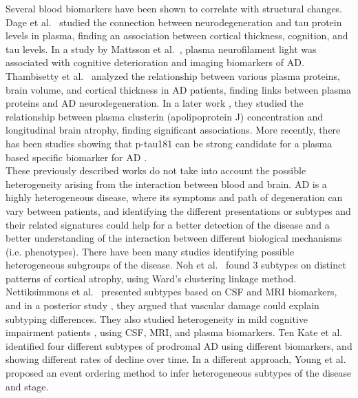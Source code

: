 Several blood biomarkers have been shown to correlate with structural changes. Dage et al.\ \cite{Dage2016} studied the connection between neurodegeneration and tau protein levels in plasma, finding an association between cortical thickness, cognition, and tau levels. In a study by Mattsson et al.\ \cite{Mattsson2017}, plasma neurofilament light was associated with cognitive deterioration and imaging biomarkers of AD. Thambisetty et al.\ \cite{Thambisetty2011} analyzed the relationship between various plasma proteins, brain volume, and cortical thickness in AD patients, finding links between plasma proteins and AD neurodegeneration. In a later work \cite{Thambisetty2012}, they studied the relationship between plasma clusterin (apolipoprotein J) concentration and longitudinal brain atrophy, finding significant associations.  More recently, there has been studies showing that p-tau181 can be strong candidate for a plasma based specific biomarker for AD \cite{Cullen2020,Moscoso2020,Karikari2020a}. \\

These previously described works do not take into account the possible heterogeneity arising from the interaction between blood and brain. AD is a highly heterogeneous disease, where its symptoms and path of degeneration can vary between patients, and identifying the different presentations or subtypes and their related signatures could help for a better detection of the disease and a better understanding of the interaction between different biological mechanisms (i.e. phenotypes). There have been many studies identifying possible heterogeneous subgroups of the disease. Noh et al.\ \cite{Noh2014} found 3 subtypes on distinct patterns of cortical atrophy, using Ward's clustering linkage method. Nettiksimmons et al.\ \cite{Nettiksimmons2010} presented subtypes based on CSF and MRI biomarkers, and in a posterior study \cite{Nettiksimmons2013}, they argued that vascular damage could explain subtyping differences. They also studied heterogeneity in mild cognitive impairment patients \cite{Nettiksimmons2014}, using CSF, MRI, and plasma biomarkers. Ten Kate et al.\ \cite{TenKate2018} identified four different subtypes of prodromal AD using different biomarkers, and showing different rates of decline over time. In a different approach, Young et al.\ \cite{Young2015a,Young2017} proposed an event ordering method to infer heterogeneous subtypes of the disease and stage.  \\

